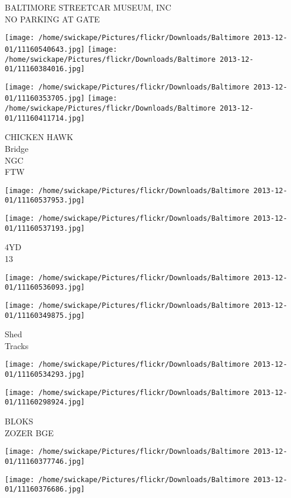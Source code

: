 \documentclass[10pt,letterpaper]{article}
\begin{document}
BALTIMORE STREETCAR MUSEUM, INC\\
NO PARKING AT GATE
\pagebreak

\texttt{[image: /home/swickape/Pictures/flickr/Downloads/Baltimore 2013-12-01/11160540643.jpg]}
\texttt{[image: /home/swickape/Pictures/flickr/Downloads/Baltimore 2013-12-01/11160384016.jpg]}

\texttt{[image: /home/swickape/Pictures/flickr/Downloads/Baltimore 2013-12-01/11160353705.jpg]}
\texttt{[image: /home/swickape/Pictures/flickr/Downloads/Baltimore 2013-12-01/11160411714.jpg]}

CHICKEN HAWK\\
Bridge\\
NGC\\
FTW
\pagebreak

\texttt{[image: /home/swickape/Pictures/flickr/Downloads/Baltimore 2013-12-01/11160537953.jpg]}

\vspace{0.25in}
\texttt{[image: /home/swickape/Pictures/flickr/Downloads/Baltimore 2013-12-01/11160537193.jpg]}

4YD\\
13
\pagebreak

\texttt{[image: /home/swickape/Pictures/flickr/Downloads/Baltimore 2013-12-01/11160536093.jpg]}

\vspace{0.25in}
\texttt{[image: /home/swickape/Pictures/flickr/Downloads/Baltimore 2013-12-01/11160349875.jpg]}

Shed\\
Tracks
\pagebreak

\texttt{[image: /home/swickape/Pictures/flickr/Downloads/Baltimore 2013-12-01/11160534293.jpg]}

\vspace{0.25in}
\texttt{[image: /home/swickape/Pictures/flickr/Downloads/Baltimore 2013-12-01/11160298924.jpg]}

BLOKS\\
ZOZER BGE
\pagebreak

\texttt{[image: /home/swickape/Pictures/flickr/Downloads/Baltimore 2013-12-01/11160377746.jpg]}

\vspace{0.25in}
\texttt{[image: /home/swickape/Pictures/flickr/Downloads/Baltimore 2013-12-01/11160376686.jpg]}
\end{document}
